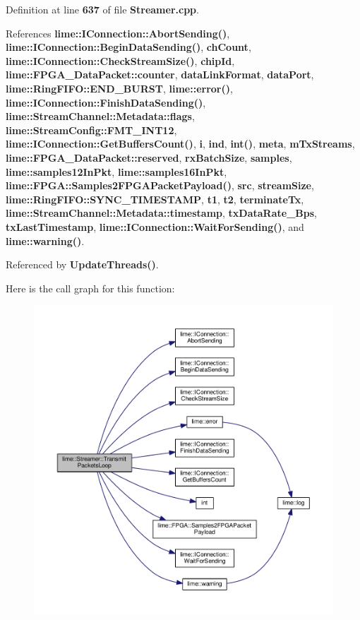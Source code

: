Definition at line {\bf 637} of file {\bf Streamer.\+cpp}.



References {\bf lime\+::\+I\+Connection\+::\+Abort\+Sending()}, {\bf lime\+::\+I\+Connection\+::\+Begin\+Data\+Sending()}, {\bf ch\+Count}, {\bf lime\+::\+I\+Connection\+::\+Check\+Stream\+Size()}, {\bf chip\+Id}, {\bf lime\+::\+F\+P\+G\+A\+\_\+\+Data\+Packet\+::counter}, {\bf data\+Link\+Format}, {\bf data\+Port}, {\bf lime\+::\+Ring\+F\+I\+F\+O\+::\+E\+N\+D\+\_\+\+B\+U\+R\+ST}, {\bf lime\+::error()}, {\bf lime\+::\+I\+Connection\+::\+Finish\+Data\+Sending()}, {\bf lime\+::\+Stream\+Channel\+::\+Metadata\+::flags}, {\bf lime\+::\+Stream\+Config\+::\+F\+M\+T\+\_\+\+I\+N\+T12}, {\bf lime\+::\+I\+Connection\+::\+Get\+Buffers\+Count()}, {\bf i}, {\bf ind}, {\bf int()}, {\bf meta}, {\bf m\+Tx\+Streams}, {\bf lime\+::\+F\+P\+G\+A\+\_\+\+Data\+Packet\+::reserved}, {\bf rx\+Batch\+Size}, {\bf samples}, {\bf lime\+::samples12\+In\+Pkt}, {\bf lime\+::samples16\+In\+Pkt}, {\bf lime\+::\+F\+P\+G\+A\+::\+Samples2\+F\+P\+G\+A\+Packet\+Payload()}, {\bf src}, {\bf stream\+Size}, {\bf lime\+::\+Ring\+F\+I\+F\+O\+::\+S\+Y\+N\+C\+\_\+\+T\+I\+M\+E\+S\+T\+A\+MP}, {\bf t1}, {\bf t2}, {\bf terminate\+Tx}, {\bf lime\+::\+Stream\+Channel\+::\+Metadata\+::timestamp}, {\bf tx\+Data\+Rate\+\_\+\+Bps}, {\bf tx\+Last\+Timestamp}, {\bf lime\+::\+I\+Connection\+::\+Wait\+For\+Sending()}, and {\bf lime\+::warning()}.



Referenced by {\bf Update\+Threads()}.



Here is the call graph for this function\+:
\nopagebreak
\begin{figure}[H]
\begin{center}
\leavevmode
\includegraphics[width=350pt]{d9/d5d/classlime_1_1Streamer_a7609688279492ce5938fcee2e9a5cfb2_cgraph}
\end{center}
\end{figure}




